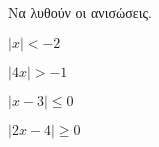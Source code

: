 \item Να λυθούν οι ανισώσεις.
\begin{multicols}{4}
\begin{alist}
\item $ \left|x\right|<-2 $
\item $ \left|4x\right|>-1 $
\item $ \left|x-3\right|\leq0 $
\item $ \left|2x-4\right|\geq0 $
\end{alist}
\end{multicols}
